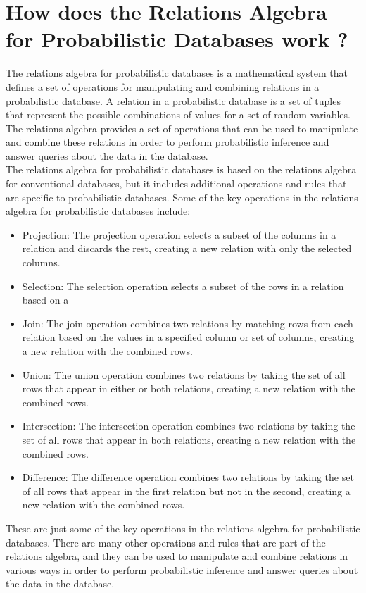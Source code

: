 \chapter{How does the Relations Algebra for Probabilistic Databases work ?}

The relations algebra for probabilistic databases is a mathematical system that defines a set of operations for manipulating and combining relations in a probabilistic database. A relation in a probabilistic database is a set of tuples that represent the possible combinations of values for a set of random variables. The relations algebra provides a set of operations that can be used to manipulate and combine these relations in order to perform probabilistic inference and answer queries about the data in the database. \\

The relations algebra for probabilistic databases is based on the relations algebra for conventional databases, but it includes additional operations and rules that are specific to probabilistic databases. Some of the key operations in the relations algebra for probabilistic databases include:\\

\begin{itemize}
	\item Projection: The projection operation selects a subset of the columns in a relation and discards the rest, creating a new relation with only the selected columns.
	
	\item Selection: The selection operation selects a subset of the rows in a relation based on a 
	
	\item Join: The join operation combines two relations by matching rows from each relation based on the values in a specified column or set of columns, creating a new relation with the combined rows.
	
	\item Union: The union operation combines two relations by taking the set of all rows that appear in either or both relations, creating a new relation with the combined rows.
	
	\item Intersection: The intersection operation combines two relations by taking the set of all rows that appear in both relations, creating a new relation with the combined rows.
	
	\item Difference: The difference operation combines two relations by taking the set of all rows that appear in the first relation but not in the second, creating a new relation with the combined rows.

\end{itemize}


These are just some of the key operations in the relations algebra for probabilistic databases. There are many other operations and rules that are part of the relations algebra, and they can be used to manipulate and combine relations in various ways in order to perform probabilistic inference and answer queries about the data in the database.